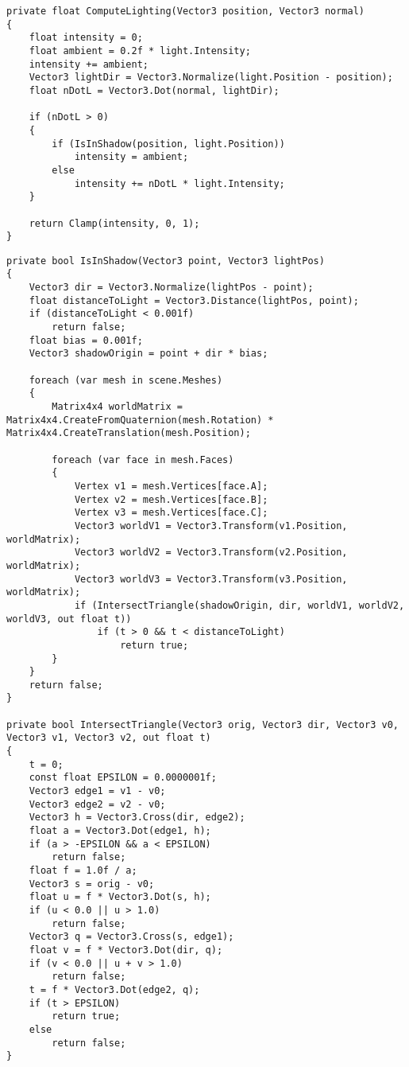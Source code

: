 \begin{center}
\captionsetup{justification=raggedright,singlelinecheck=off}
\begin{lstlisting}[label=lst:guro,caption=Реализация модели освещения Ламберта,numbers=none]
private float ComputeLighting(Vector3 position, Vector3 normal)
{
    float intensity = 0;
    float ambient = 0.2f * light.Intensity;
    intensity += ambient;
    Vector3 lightDir = Vector3.Normalize(light.Position - position);
    float nDotL = Vector3.Dot(normal, lightDir);

    if (nDotL > 0)
    {
        if (IsInShadow(position, light.Position))
            intensity = ambient;
        else
            intensity += nDotL * light.Intensity;
    }

    return Clamp(intensity, 0, 1);
}
\end{lstlisting}
\end{center}

\begin{center}
\captionsetup{justification=raggedright,singlelinecheck=off}
\begin{lstlisting}[label=lst:shadow,caption=Реализация алгоритма проверки затенения точки объектом,numbers=none]
private bool IsInShadow(Vector3 point, Vector3 lightPos)
{
    Vector3 dir = Vector3.Normalize(lightPos - point);
    float distanceToLight = Vector3.Distance(lightPos, point);
    if (distanceToLight < 0.001f)
        return false;
    float bias = 0.001f;
    Vector3 shadowOrigin = point + dir * bias;

    foreach (var mesh in scene.Meshes)
    {
        Matrix4x4 worldMatrix = Matrix4x4.CreateFromQuaternion(mesh.Rotation) * Matrix4x4.CreateTranslation(mesh.Position);

        foreach (var face in mesh.Faces)
        {
            Vertex v1 = mesh.Vertices[face.A];
            Vertex v2 = mesh.Vertices[face.B];
            Vertex v3 = mesh.Vertices[face.C];
            Vector3 worldV1 = Vector3.Transform(v1.Position, worldMatrix);
            Vector3 worldV2 = Vector3.Transform(v2.Position, worldMatrix);
            Vector3 worldV3 = Vector3.Transform(v3.Position, worldMatrix);
            if (IntersectTriangle(shadowOrigin, dir, worldV1, worldV2, worldV3, out float t))
                if (t > 0 && t < distanceToLight)
                    return true;
        }
    }
    return false;
}

private bool IntersectTriangle(Vector3 orig, Vector3 dir, Vector3 v0, Vector3 v1, Vector3 v2, out float t)
{
    t = 0;
    const float EPSILON = 0.0000001f;
    Vector3 edge1 = v1 - v0;
    Vector3 edge2 = v2 - v0;
    Vector3 h = Vector3.Cross(dir, edge2);
    float a = Vector3.Dot(edge1, h);
    if (a > -EPSILON && a < EPSILON)
        return false;
    float f = 1.0f / a;
    Vector3 s = orig - v0;
    float u = f * Vector3.Dot(s, h);
    if (u < 0.0 || u > 1.0)
        return false;
    Vector3 q = Vector3.Cross(s, edge1);
    float v = f * Vector3.Dot(dir, q);
    if (v < 0.0 || u + v > 1.0)
        return false;
    t = f * Vector3.Dot(edge2, q);
    if (t > EPSILON)
        return true;
    else
        return false;
}
\end{lstlisting}
\end{center}
